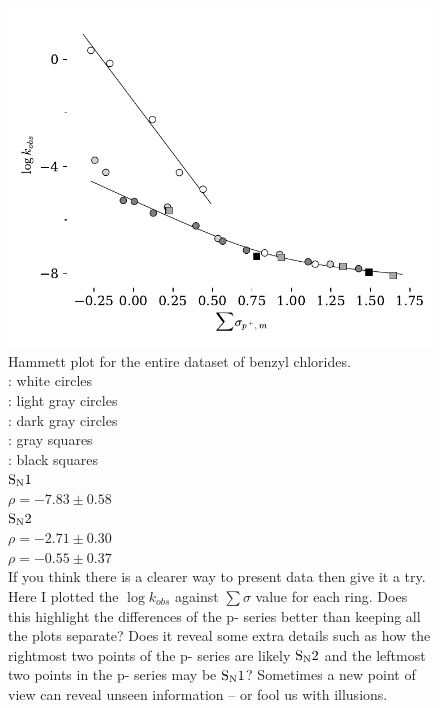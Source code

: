\documentclass{tufte-handout}
\begin{document}
\begin{figure}[h!]
  \centering
  \includegraphics[scale=0.8]{images/plot9s.pdf}
  \caption[-0mm]{Hammett plot for the entire dataset of benzyl chlorides.  \vspace{2mm} \\ 
  : white circles  \\
  : light gray circles  \\
  : dark gray circles  \\
  : gray squares   \\
  : black squares   \vspace{2mm}  \\

    {$\rm S_N1$}  \\
    \hspace{3mm} $\rho = -7.83 \pm 0.58$ \vspace{2mm} \\
    {$\rm S_N2$}  \\
    \hspace{3mm} $\rho = -2.71 \pm 0.30$  \\
    \hspace{3mm} $\rho = -0.55 \pm 0.37$ \vspace{2mm} \\

     \vspace{20mm} {} If you think there is a clearer way to present data then give it a try. Here I plotted the $\log{k_{obs}}$ against $\sum \sigma$ value for each ring. Does this highlight the differences of the {p-} series better than keeping all the plots separate? Does it reveal some extra details such as how the rightmost two points of the {p-} series are likely $\rm S_N2$ and the leftmost two points in the {p-} series may be $\rm S_N1$? Sometimes a new point of view can reveal unseen information -- or fool us with illusions.
 } 
  \label{fig:YK2}
\end{figure}
\end{document}
